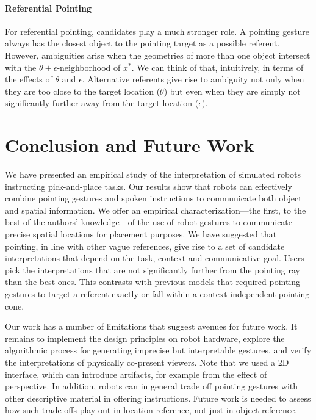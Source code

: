 \documentclass[letterpaper]{article} %
\begin{document}
\paragraph{Referential Pointing}  For referential pointing, candidates play a much stronger role.  A pointing gesture always has the closest object to the pointing target as a possible referent.  However, ambiguities arise when the geometries of more than one object intersect with the $\theta+\epsilon$-neighborhood of $x^*$.   We can think of that, intuitively, in terms of the effects of $\theta$ and $\epsilon$.  Alternative referents give rise to ambiguity not only when they are too close to the target location ($\theta$) but even when they are simply not significantly further away from the target location ($\epsilon$).  

\section{Conclusion and Future Work}
\label{conclusion}

We have presented an empirical study of the interpretation of simulated robots instructing pick-and-place tasks.  Our results show that robots can effectively combine pointing gestures and spoken instructions to communicate both object and spatial information. We offer an empirical characterization---the first, to the best of the authors' knowledge---of the use of robot gestures to communicate precise spatial locations for placement purposes.  We have suggested that pointing, in line with other vague references, give rise to a set of candidate interpretations that depend on the task, context and communicative goal.  Users pick the interpretations that are not significantly further from the pointing ray than the best ones.  This contrasts with previous models that required pointing gestures to target a referent exactly or fall within a context-independent pointing cone.

Our work has a number of limitations that suggest avenues for future work.   It remains to implement the design principles on robot hardware, explore the algorithmic process for generating imprecise but interpretable gestures, and verify the interpretations of physically co-present viewers.  Note that we used a 2D interface, which can introduce artifacts, for example from the effect of perspective.  In addition, robots can in general trade off pointing gestures with other descriptive material in offering instructions.  Future work is needed to assess how such trade-offs play out in location reference, not just in object reference.
\end{document}
